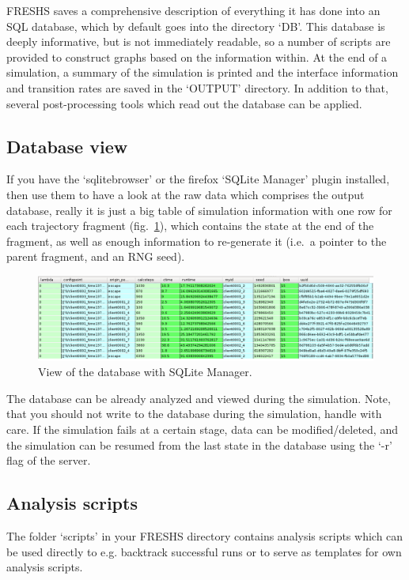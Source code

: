 \documentclass[a4paper,oneside]{article}
\begin{document}
FRESHS saves a comprehensive description of everything it has done into an SQL database, which by default goes into the directory `DB'.  This database is deeply informative, but is not immediately readable, so a number of scripts are provided to construct graphs based on the information within. At the end of a simulation, a summary of the simulation is printed and the interface information and transition rates are saved in the `OUTPUT' directory. In addition to that, several post-processing tools which read out the database can be applied.

\subsection{Database view}
If you have the `sqlitebrowser' or the firefox `SQLite Manager' plugin installed, then use them to have a look at the raw data which comprises the output database, really it is just a big table of simulation information with one row for each trajectory fragment (fig.~\ref{fig:sqlitemanager}), which contains the state at the end of the fragment, as well as enough information to re-generate it (i.e.~a pointer to the parent fragment, and an RNG seed).
\begin{figure}
 \centering
 \includegraphics[width=0.99\linewidth]{pics/freshs-sqlite-view}
 \caption{View of the database with SQLite Manager.}
 \label{fig:sqlitemanager}
\end{figure}
The database can be already analyzed and viewed during the simulation. Note, that you should not write to the database during the simulation, handle with care. If the simulation fails at a certain stage, data can be modified/deleted, and the simulation can be resumed from the last state in the database using the `-r' flag of the server.

\subsection{Analysis scripts}
The folder `scripts' in your FRESHS directory contains analysis scripts which can be used directly to e.g. backtrack successful runs or to serve as templates for own analysis scripts.
\end{document}
